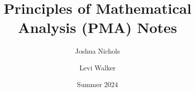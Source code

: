 \documentclass[12pt]{article}
\author{
    Joshua Nichols\\
    \and
    Levi Walker
}
\date{Summer 2024}
\title{Principles of Mathematical Analysis (PMA) Notes}
\begin{document}
\maketitle

\tableofcontents

\pagebreak

\end{document}
